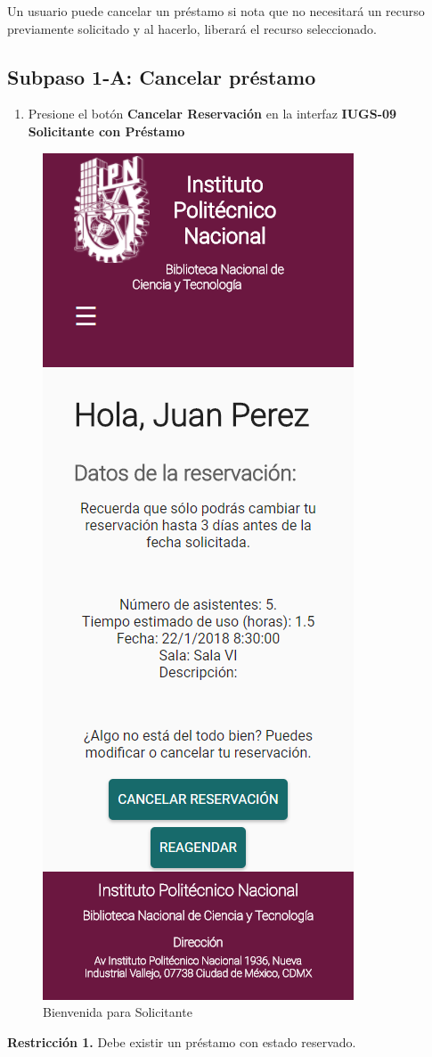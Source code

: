 Un usuario puede cancelar un préstamo si nota que no necesitará un recurso previamente solicitado
y al hacerlo, liberará el recurso seleccionado.

\subsection{Subpaso 1-A: Cancelar préstamo}
\begin{enumerate}
	\item Presione el botón \textbf{Cancelar Reservación} en la interfaz
    \textbf{IUGS-09 Solicitante con Préstamo}
\end{enumerate}

\begin{figure}[hbtp]
		
		\includegraphics[scale=0.3]{images/InterfazMovil/IUGS05_binevenida.png}
		\caption{Bienvenida para Solicitante}
	\end{figure}


\textbf{Restricción 1.} Debe existir un préstamo con estado reservado.
